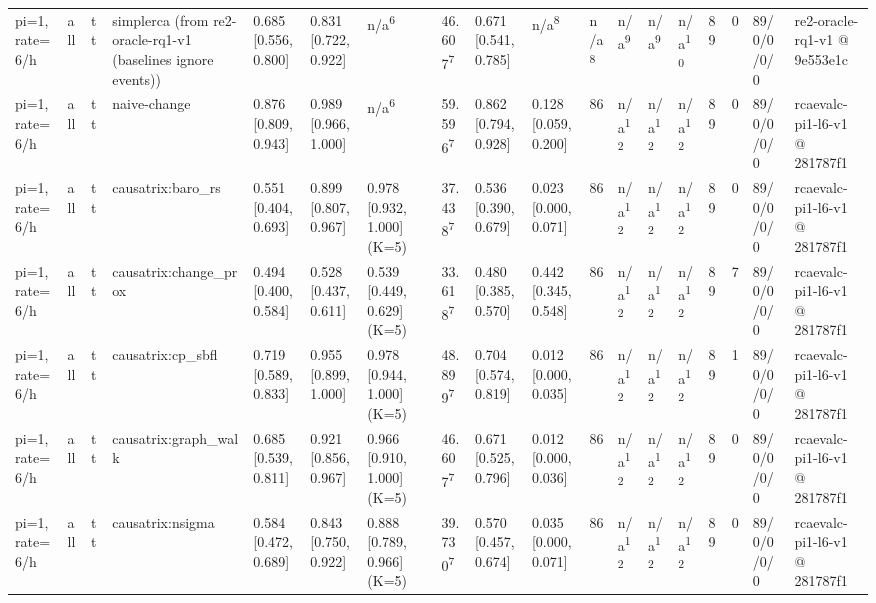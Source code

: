 \begin{table}[t]
\begin{tabular}{llllllllllllllllll}
pi=1, rate=6/h & all & tt & simplerca (from re2-oracle-rq1-v1 (baselines ignore events)) & 0.685 [0.556, 0.800] & 0.831 [0.722, 0.922] & n/a\textsuperscript{6} & 46.607\textsuperscript{7} & 0.671 [0.541, 0.785] & n/a\textsuperscript{8} & n/a\textsuperscript{8} & n/a\textsuperscript{9} & n/a\textsuperscript{9} & n/a\textsuperscript{10} & 89 & 0 & 89/0/0/0/0 & re2-oracle-rq1-v1 @ 9e553e1c \\
pi=1, rate=6/h & all & tt & naive-change & 0.876 [0.809, 0.943] & 0.989 [0.966, 1.000] & n/a\textsuperscript{6} & 59.596\textsuperscript{7} & 0.862 [0.794, 0.928] & 0.128 [0.059, 0.200] & 86 & n/a\textsuperscript{12} & n/a\textsuperscript{12} & n/a\textsuperscript{12} & 89 & 0 & 89/0/0/0/0 & rcaevalc-pi1-l6-v1 @ 281787f1 \\
pi=1, rate=6/h & all & tt & causatrix:baro\_rs & 0.551 [0.404, 0.693] & 0.899 [0.807, 0.967] & 0.978 [0.932, 1.000] (K=5) & 37.438\textsuperscript{7} & 0.536 [0.390, 0.679] & 0.023 [0.000, 0.071] & 86 & n/a\textsuperscript{12} & n/a\textsuperscript{12} & n/a\textsuperscript{12} & 89 & 0 & 89/0/0/0/0 & rcaevalc-pi1-l6-v1 @ 281787f1 \\
pi=1, rate=6/h & all & tt & causatrix:change\_prox & 0.494 [0.400, 0.584] & 0.528 [0.437, 0.611] & 0.539 [0.449, 0.629] (K=5) & 33.618\textsuperscript{7} & 0.480 [0.385, 0.570] & 0.442 [0.345, 0.548] & 86 & n/a\textsuperscript{12} & n/a\textsuperscript{12} & n/a\textsuperscript{12} & 89 & 7 & 89/0/0/0/0 & rcaevalc-pi1-l6-v1 @ 281787f1 \\
pi=1, rate=6/h & all & tt & causatrix:cp\_sbfl & 0.719 [0.589, 0.833] & 0.955 [0.899, 1.000] & 0.978 [0.944, 1.000] (K=5) & 48.899\textsuperscript{7} & 0.704 [0.574, 0.819] & 0.012 [0.000, 0.035] & 86 & n/a\textsuperscript{12} & n/a\textsuperscript{12} & n/a\textsuperscript{12} & 89 & 1 & 89/0/0/0/0 & rcaevalc-pi1-l6-v1 @ 281787f1 \\
pi=1, rate=6/h & all & tt & causatrix:graph\_walk & 0.685 [0.539, 0.811] & 0.921 [0.856, 0.967] & 0.966 [0.910, 1.000] (K=5) & 46.607\textsuperscript{7} & 0.671 [0.525, 0.796] & 0.012 [0.000, 0.036] & 86 & n/a\textsuperscript{12} & n/a\textsuperscript{12} & n/a\textsuperscript{12} & 89 & 0 & 89/0/0/0/0 & rcaevalc-pi1-l6-v1 @ 281787f1 \\
pi=1, rate=6/h & all & tt & causatrix:nsigma & 0.584 [0.472, 0.689] & 0.843 [0.750, 0.922] & 0.888 [0.789, 0.966] (K=5) & 39.730\textsuperscript{7} & 0.570 [0.457, 0.674] & 0.035 [0.000, 0.071] & 86 & n/a\textsuperscript{12} & n/a\textsuperscript{12} & n/a\textsuperscript{12} & 89 & 0 & 89/0/0/0/0 & rcaevalc-pi1-l6-v1 @ 281787f1 \\

\end{tabular}
\end{table}
